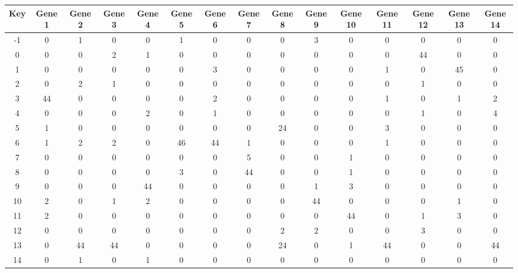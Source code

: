 \begin{tabular}{|c|c|c|c|c|c|c|c|c|c|c|c|c|c|c|}
\hline
Key & Gene 1 & Gene 2 & Gene 3 & Gene 4 & Gene 5 & Gene 6 & Gene 7 & Gene 8 & Gene 9 & Gene 10 & Gene 11 & Gene 12 & Gene 13 & Gene 14 \\
\hline
-1 & 0 & 1 & 0 & 0 & 1 & 0 & 0 & 0 & 3 & 0 & 0 & 0 & 0 & 0 \\
0 & 0 & 0 & 2 & 1 & 0 & 0 & 0 & 0 & 0 & 0 & 0 & 44 & 0 & 0 \\
1 & 0 & 0 & 0 & 0 & 0 & 3 & 0 & 0 & 0 & 0 & 1 & 0 & 45 & 0 \\
2 & 0 & 2 & 1 & 0 & 0 & 0 & 0 & 0 & 0 & 0 & 0 & 1 & 0 & 0 \\
3 & 44 & 0 & 0 & 0 & 0 & 2 & 0 & 0 & 0 & 0 & 1 & 0 & 1 & 2 \\
4 & 0 & 0 & 0 & 2 & 0 & 1 & 0 & 0 & 0 & 0 & 0 & 1 & 0 & 4 \\
5 & 1 & 0 & 0 & 0 & 0 & 0 & 0 & 24 & 0 & 0 & 3 & 0 & 0 & 0 \\
6 & 1 & 2 & 2 & 0 & 46 & 44 & 1 & 0 & 0 & 0 & 1 & 0 & 0 & 0 \\
7 & 0 & 0 & 0 & 0 & 0 & 0 & 5 & 0 & 0 & 1 & 0 & 0 & 0 & 0 \\
8 & 0 & 0 & 0 & 0 & 3 & 0 & 44 & 0 & 0 & 1 & 0 & 0 & 0 & 0 \\
9 & 0 & 0 & 0 & 44 & 0 & 0 & 0 & 0 & 1 & 3 & 0 & 0 & 0 & 0 \\
10 & 2 & 0 & 1 & 2 & 0 & 0 & 0 & 0 & 44 & 0 & 0 & 0 & 1 & 0 \\
11 & 2 & 0 & 0 & 0 & 0 & 0 & 0 & 0 & 0 & 44 & 0 & 1 & 3 & 0 \\
12 & 0 & 0 & 0 & 0 & 0 & 0 & 0 & 2 & 2 & 0 & 0 & 3 & 0 & 0 \\
13 & 0 & 44 & 44 & 0 & 0 & 0 & 0 & 24 & 0 & 1 & 44 & 0 & 0 & 44 \\
14 & 0 & 1 & 0 & 1 & 0 & 0 & 0 & 0 & 0 & 0 & 0 & 0 & 0 & 0 \\
\hline
\end{tabular}